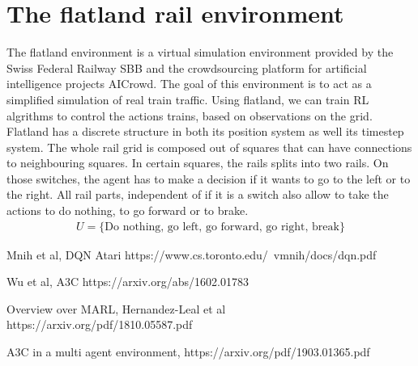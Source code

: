 \section{The flatland rail environment}\label{projektmanagement}
The flatland environment is a virtual simulation environment provided by the Swiss Federal Railway SBB and the crowdsourcing platform for artificial intelligence projects AICrowd.
The goal of this environment is to act as a simplified simulation of real train traffic. Using flatland, we can train RL algrithms to control the actions trains, based on observations on the grid. Flatland has a discrete structure in both its position system as well its timestep system. The whole rail grid is composed out of squares that can have connections to neighbouring squares. In certain squares, the rails splits into two rails. On those switches, the agent has to make a decision if it wants to go to the left or to the right. All rail parts, independent of if it is a switch also allow to take the actions to do nothing, to go forward or to brake.
\begin{gather*}
U = \{ \text{Do nothing, go left, go forward, go right, break} \}
\end{gather*}





Mnih et al, DQN Atari
https://www.cs.toronto.edu/~vmnih/docs/dqn.pdf

Wu et al, A3C
https://arxiv.org/abs/1602.01783

Overview over MARL, Hernandez-Leal et al
https://arxiv.org/pdf/1810.05587.pdf

A3C in a multi agent environment, 
https://arxiv.org/pdf/1903.01365.pdf


